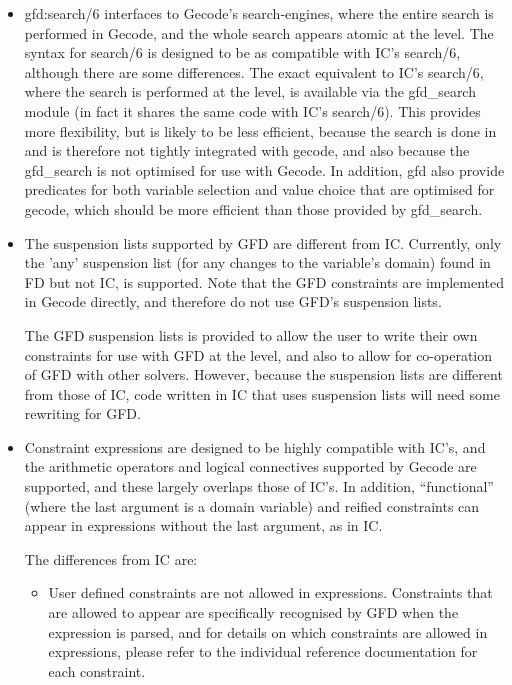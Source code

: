 \begin{itemize}
       \item gfd:search/6 interfaces to Gecode's search-engines, where the
       entire search is performed in Gecode, and the whole search appears
       atomic at the \eclipse level. The syntax for search/6 is designed to
       be as compatible with IC's search/6, although there are some 
       differences. The exact equivalent to IC's search/6, where the search
       is performed at the \eclipse level, is available via the gfd_search
       module (in fact it shares the same code with IC's search/6). This
       provides more flexibility, but is likely to be less efficient,
       because the search is done in \eclipse and is therefore not
       tightly integrated with gecode, and also because the 
       gfd_search is not optimised for use with Gecode. In addition,
       gfd also provide predicates for both variable selection and
       value choice that are optimised for gecode, which should be more
       efficient than those provided by gfd_search.


       \item The suspension lists supported by GFD are different from IC.
       Currently, only the 'any' suspension list (for any changes to the
       variable's domain) found in FD but not IC, is supported. Note that
       the GFD constraints are implemented in Gecode directly, and therefore
       do not use GFD's suspension lists. 

       The GFD suspension lists is provided to allow the user to write their 
       own  constraints for use with GFD at the \eclipse level, and also to 
       allow for co-operation of GFD with other solvers. However, because the 
       suspension lists are different from those of IC, code written in IC 
       that uses suspension lists will need some rewriting for GFD. 

      \item Constraint expressions are designed to be highly compatible with 
      IC's, and the arithmetic operators and logical connectives supported 
      by Gecode are supported, and these largely overlaps those of IC's.
      In addition, ``functional'' (where the last argument is a domain 
      variable) and reified constraints can appear in expressions without the
      last argument, as in IC.

      The differences from IC are:
      \begin{itemize}
        \item User defined constraints are not allowed in expressions. 
        Constraints that are allowed to appear are specifically recognised
        by GFD when the expression is parsed, and for details on which
        constraints are allowed in expressions, please refer to the individual 
        reference documentation for each constraint.
 

\end{itemize}
\end{itemize}
